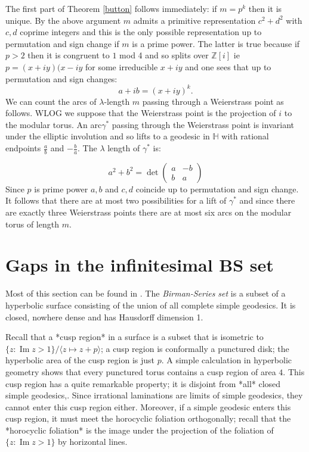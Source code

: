 \documentclass[14pt,a4paper]{amsart}
\def\HH{\mathbb{H}}
\def\ZZ{\mathbb{Z}}
\begin{document}
 The first part of Theorem \ref{button} follows immediately: if
 $m=p^k$ then it is unique. By the above argument $m$ admits a
 primitive representation $c^2 + d^2$ with $c,d$ coprime integers
 and this is the only possible representation up to permutation and
 sign change if $m$ is a prime power.
The latter is true because if $p > 2$ then it is congruent to $1$
mod 4 and so splits over $\ZZ[i]$ ie $p = (x + iy)(x - iy$ for some
irreducible $x + iy$ and one sees that up to permutation and sign
changes:
\begin{equation*}
	a + ib = (x + iy)^k.
\end{equation*}
We can count the arcs of $\lambda$-length $m$ passing through a
Weierstrass point as follows. WLOG we suppose that the Weierstrass
point is the projection of $i$ to the modular torus. An
arc$\gamma^*$  passing through the Weierstrass point is  invariant under the elliptic
involution and so lifts to a geodesic in $\HH$
with rational endpoints $\frac{a}{b}$ and $-\frac{b}{a}$.
The $\lambda$ length of $\gamma^*$ is:

\begin{equation*} 
	a^2 + b^2 
	= \det \begin{pmatrix} a & -b \\ b & a
\end{pmatrix} 
	\end{equation*}
Since $p$ is prime power $a,b$ and $c,d$ coincide up to permutation
and sign change. It follows that there are at most  two possibilities for a lift of $\gamma^*$ and since there are exactly three Weierstrass points there are at most six arcs on the modular torus of length
$m$.



\section{Gaps in the infinitesimal BS set}


Most of this section can be found in \cite{weierstrass}.
The \textit{Birman-Series set} is a subset of a hyperbolic surface consisting of the union of all complete simple geodesics. It  is closed, nowhere dense and has Hausdorff dimension 1.



Recall that a *cusp region* in a surface is a subset that is isometric to $\{z \colon \operatorname{Im} z > 1\}/\langle z \mapsto z + p\rangle$; a cusp region is conformally a punctured disk; the hyperbolic area of the cusp region is just $p$. A simple calculation in hyperbolic geometry shows that every punctured torus contains a cusp region of area $4$. This cusp region has a quite remarkable property; it is disjoint from *all* closed simple geodesics,. Since irrational laminations are limits of simple geodesics, they cannot enter this cusp region either. Moreover, if a simple geodesic enters this cusp region, it must meet the horocyclic foliation orthogonally; recall that the *horocyclic foliation* is the image under the projection of the foliation of $\{z \colon \operatorname{Im} z > 1\}$ by horizontal lines.
\end{document}
